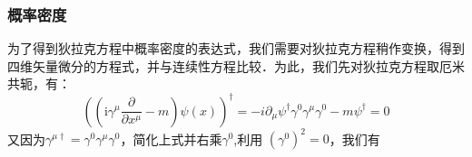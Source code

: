 \subsubsection{概率密度}
为了得到狄拉克方程中概率密度的表达式，我们需要对狄拉克方程稍作变换，得到四维矢量微分的方程式，并与连续性方程比较．为此，我们先对狄拉克方程取厄米共轭，有：
\begin{equation}
\left(\left(\mathrm{i} \gamma^{\mu} \frac{\partial}{\partial x^{\mu}}-m\right) \psi(x)\right)^{\dagger}=-i \partial_{\mu} \psi^{\dagger} \gamma^{0} \gamma^{\mu} \gamma^{0}-m \psi^{\dagger}=0
\end{equation}
又因为$\gamma^{\mu \dagger}=\gamma^{0} \gamma^{\mu} \gamma^{0}$，简化上式并右乘$\gamma ^0$,利用 $(\gamma^{0})^2=0$，我们有






